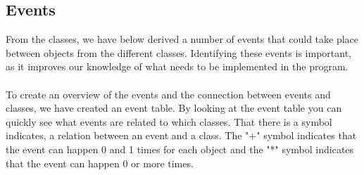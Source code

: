 \subsection{Events}
From the classes, we have below derived a number of events that could take place between objects from the different classes. Identifying these events is important, as it improves our knowledge of what needs to be implemented in the program.\\
\\
To create an overview of the events and the connection between events and classes, we have created an event table. By looking at the event table you can quickly see what events are related to which classes.
That there is a symbol indicates, a relation between an event and a class. The "+" symbol indicates that the event can happen 0 and 1 times for each object and the "*" symbol indicates that the event can happen 0 or more times.

